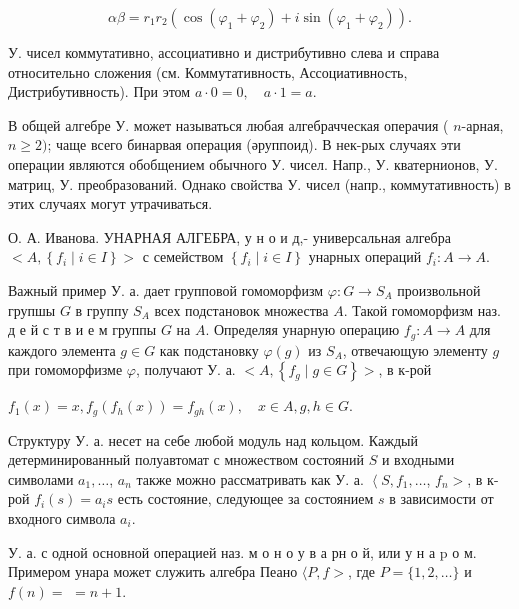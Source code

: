 \documentclass[10pt]{article}
\begin{document}
\[

\alpha \beta=r_{1} r_{2}\left(\cos \left(\varphi_{1}+\varphi_{2}\right)+i \sin \left(\varphi_{1}+\varphi_{2}\right)\right) .

\]



У. чисел коммутативно, ассоциативно и дистрибутивно слева и справа относительно сложения (см. Коммутативность, Ассоциативность, Дистрибутивность). При этом $a \cdot 0=0, \quad a \cdot 1=a$.



В общей алгебре У. может называться любая алгебрачческая операчия ( $n$-арная, $n \geqslant 2)$; чаще всего бинарвая операция (әруппоид). В нек-рых случаях эти операции являются обобщением обычного У. чисел. Напр., У. кватернионов, У. матриц, У. преобразований. Однако свойства У. чисел (напр., коммутативность) в этих случаях могут утрачиваться.



О. А. Иванова. УНАРНАЯ АЛГЕБРА, у н о и д,- универсальная алгебра $<A,\left\{f_{i} \mid i \in I\right\}>$ с семейством $\left\{f_{i} \mid i \in I\right\}$ унарных операций $f_{i}: A \rightarrow A$.



Важный пример У. а. дает групповой гомоморфизм $\varphi: G \rightarrow S_{A}$ произвольной групшы $G$ в группу $S_{A}$ всех подстановок множества $A$. Такой гомоморфизм наз. д е й с т в и е м группы $G$ на $A$. Определяя унарную операцию $f_{g}: A \rightarrow A$ для каждого элемента $g \in G$ как подстановку $\varphi(g)$ из $S_{A}$, отвечающую элементу $g$ при гомоморфизме $\varphi$, получают У. а. $<A,\left\{f_{g} \mid g \in G\right\}>$, в к-рой



$f_{1}(x)=x, f_{g}\left(f_{h}(x)\right)=f_{g h}(x), \quad x \in A, g, h \in G$.



Структуру У. а. несет на себе любой модуль над кольцом. Каждый детерминированный полуавтомат с множеством состояний $S$ и входными символами $a_{1}, \ldots$, $a_{n}$ также можно рассматривать как У. а. $\left\langle S, f_{1}, \ldots\right.$, $f_{n}>$, в к-рой $f_{i}(s)=a_{i} s$ есть состояние, следующее за состоянием $s$ в зависимости от входного символа $a_{i}$.



У. а. с одной основной операцией наз. м о н о у в а рн о й, или у н а $\mathrm{p}$ о м. Примером унара может служить алгебра Пеано $\langle P, f>$, где $P=\{1,2, \ldots\}$ и $f(n)=$ $=n+1$.
\end{document}
